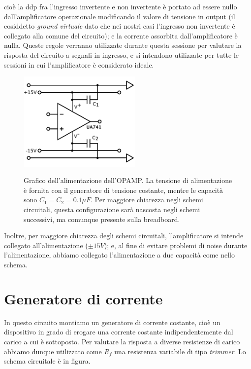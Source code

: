 \documentclass {article}
\begin{document}
cioè la ddp fra l'ingresso invertente e non invertente è portato ad essere nullo dall'amplificatore operazionale modificando il valore di tensione in output (il cosiddetto \textit{ground virtuale} dato che nei nostri casi l'ingresso non invertente è collegato alla comune del circuito); e la corrente assorbita dall'amplificatore è nulla.
Queste regole verranno utilizzate durante questa sessione per valutare la risposta del circuito a segnali in ingresso, e si intendono utilizzate per tutte le sessioni in cui l'amplificatore è considerato ideale.

\begin{figure}[ht]
 \centering
   {\includegraphics[width=6cm]{alimentazione.pdf}}
 \caption{Grafico dell'alimentazione dell'OPAMP. La tensione di alimentazione è fornita con il generatore di tensione costante, mentre le capacità sono $C_1=C_2=0.1 \mu F$. Per maggiore chiarezza negli schemi circuitali, questa configurazione sarà nascosta negli schemi successivi, ma comunque presente sulla breadboard.}
 \label{gr:costante}
\end{figure}

Inoltre, per maggiore chiarezza degli schemi circuitali, l'amplificatore si intende collegato all'alimentazione ($\pm 15 V$); e, al fine di evitare problemi di noise durante l'alimentazione, abbiamo collegato l'alimentazione a due capacità come nello schema.

\section{Generatore di corrente}

In questo circuito montiamo un generatore di corrente costante, cioè un dispositivo in grado di erogare una corrente costante indipendentemente dal carico a cui è sottoposto. Per valutare la risposta a diverse resistenze di carico abbiamo dunque utilizzato come $R_f$ una resistenza variabile di tipo \textit{trimmer}. Lo schema circuitale è in figura.
\end{document}
